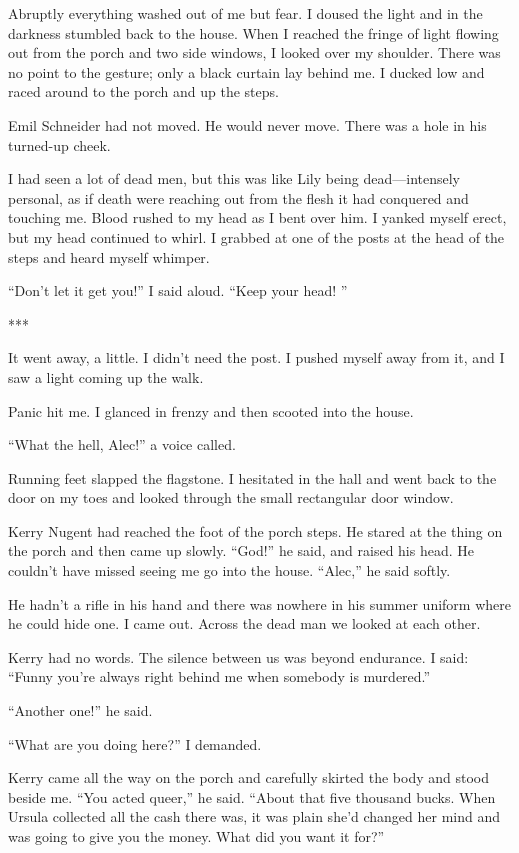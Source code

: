 \documentclass{novel}
\begin{document}
{Abruptly everything washed out of me but fear. I doused the light and in the darkness stumbled back to the house. When I reached the fringe of light flowing out from the porch and two side windows, I looked over my shoulder. There was no point to the gesture; only a black curtain lay behind me. I ducked low and raced around to the porch and up the steps.

Emil Schneider had not moved. He would never move. There was a hole in his turned-up cheek.

I had seen a lot of dead men, but this was like Lily being dead—intensely personal, as if death were reaching out from the flesh it had conquered and touching me. Blood rushed to my head as I bent over him. I yanked myself erect, but my head continued to whirl. I grabbed at one of the posts at the head of the steps and heard myself whimper.

“Don’t let it get you!” I said aloud. “Keep your head! ”

***

It went away, a little. I didn’t need the post. I pushed myself away from it, and I saw a light coming up the walk.

Panic hit me. I glanced in frenzy and then scooted into the house.

“What the hell, Alec!” a voice called.

Running feet slapped the flagstone. I hesitated in the hall and went back to the door on my toes and looked through the small rectangular door window.

Kerry Nugent had reached the foot of the porch steps. He stared at the thing on the porch and then came up slowly. “God!” he said, and raised his head. He couldn’t have missed seeing me go into the house. “Alec,” he said softly.

He hadn’t a rifle in his hand and there was nowhere in his summer uniform where he could hide one. I came out. Across the dead man we looked at each other.

Kerry had no words. The silence between us was beyond endurance. I said: “Funny you’re always right behind me when somebody is murdered.”

“Another one!” he said.

“What are you doing here?” I demanded.

Kerry came all the way on the porch and carefully skirted the body and stood beside me. “You acted queer,” he said. “About that five thousand bucks. When Ursula collected all the cash there was, it was plain she’d changed her mind and was going to give you the money. What did you want it for?”

}
\end{document}
